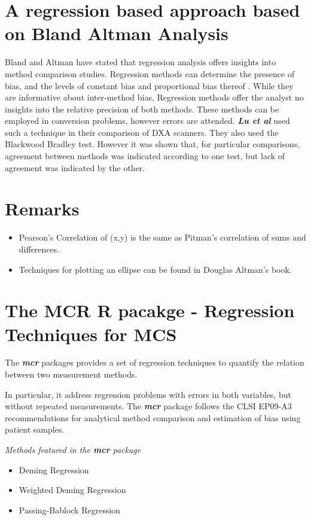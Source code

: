 \documentclass[12pt, a4paper]{report}
\theoremstyle{plain}
\theoremstyle{definition}
\theoremstyle{remark}
\begin{document}
\section{A regression based approach based on Bland Altman Analysis}
Bland and Altman have stated that regression analysis offers insights into method comparison studies. Regression methods can determine the presence of bias, and the levels of constant bias and proportional bias thereof \cite{ludbrook97,ludbrook02}.
While they are informative about inter-method bias, Regression methods offer the analyst no insights into the relative precision of both methods. These methods can be employed in conversion problems, however errors are
attended.
\emph{\textbf{Lu et al}} used such a technique in their comparison of DXA scanners. They also used the Blackwood Bradley test. However it was shown that, for particular comparisons, agreement between methods was indicated according to one test, but lack of agreement was indicated by the other.


\section*{Remarks}
\begin{itemize}
	\item Pearson's Correlation of (x,y) is the same as Pitman's correlation of sums and differences.
	
	\item Techniques for plotting an ellipse can be found in Douglas Altman's book.
\end{itemize}

\section{The MCR R pacakge - Regression Techniques for MCS}

The \textbf{\textit{mcr}} packages provides a set of regression techniques to quantify the relation between two measurement methods.

In particular, it address regression problems with errors in both variables, but without repeated measurements.
The \textbf{\textit{mcr}} package follows the CLSI EP09-A3 recommendations for analytical
method comparison and estimation of bias using patient samples.


\textit{Methods featured in the \textbf{mcr} package}

\begin{itemize}
	\item Deming Regression
	\item Weighted Deming Regression
	\item Passing-Bablock Regression
\end{itemize}
\end{document}
